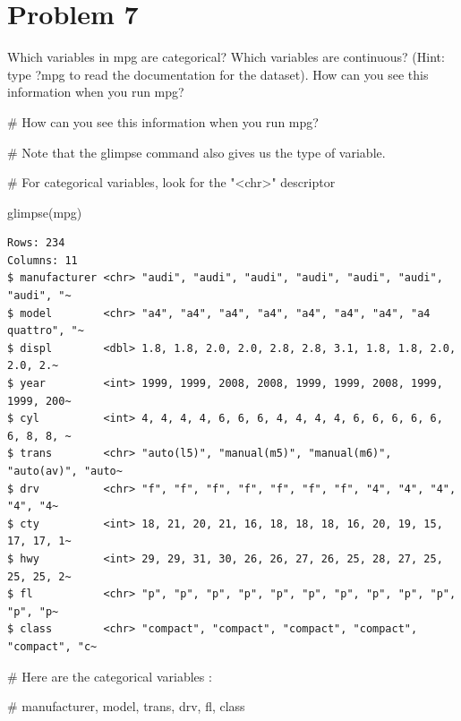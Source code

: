 \documentclass[
  letterpaper,
  DIV=11,
  numbers=noendperiod]{scrreprt}
\newenvironment{Shaded}{\begin{snugshade}}{\end{snugshade}}
\newcommand{\CommentTok}[1]{\textcolor[rgb]{0.37,0.37,0.37}{#1}}
\newcommand{\FunctionTok}[1]{\textcolor[rgb]{0.28,0.35,0.67}{#1}}
\newcommand{\NormalTok}[1]{\textcolor[rgb]{0.00,0.23,0.31}{#1}}
\begin{document}
\section*{Problem 7}\label{problem-7-3}


Which variables in mpg are categorical? Which variables are continuous?
(Hint: type ?mpg to read the documentation for the dataset). How can you
see this information when you run mpg?

\begin{Shaded}
\begin{Highlighting}[]
\CommentTok{\# How can you see this information when you run mpg?}

\CommentTok{\# Note that the glimpse command also gives us the type of variable.}

\CommentTok{\# For categorical variables, look for the "\textless{}chr\textgreater{}" descriptor}

\FunctionTok{glimpse}\NormalTok{(mpg)}
\end{Highlighting}
\end{Shaded}

\begin{verbatim}
Rows: 234
Columns: 11
$ manufacturer <chr> "audi", "audi", "audi", "audi", "audi", "audi", "audi", "~
$ model        <chr> "a4", "a4", "a4", "a4", "a4", "a4", "a4", "a4 quattro", "~
$ displ        <dbl> 1.8, 1.8, 2.0, 2.0, 2.8, 2.8, 3.1, 1.8, 1.8, 2.0, 2.0, 2.~
$ year         <int> 1999, 1999, 2008, 2008, 1999, 1999, 2008, 1999, 1999, 200~
$ cyl          <int> 4, 4, 4, 4, 6, 6, 6, 4, 4, 4, 4, 6, 6, 6, 6, 6, 6, 8, 8, ~
$ trans        <chr> "auto(l5)", "manual(m5)", "manual(m6)", "auto(av)", "auto~
$ drv          <chr> "f", "f", "f", "f", "f", "f", "f", "4", "4", "4", "4", "4~
$ cty          <int> 18, 21, 20, 21, 16, 18, 18, 18, 16, 20, 19, 15, 17, 17, 1~
$ hwy          <int> 29, 29, 31, 30, 26, 26, 27, 26, 25, 28, 27, 25, 25, 25, 2~
$ fl           <chr> "p", "p", "p", "p", "p", "p", "p", "p", "p", "p", "p", "p~
$ class        <chr> "compact", "compact", "compact", "compact", "compact", "c~
\end{verbatim}

\begin{Shaded}
\begin{Highlighting}[]
\CommentTok{\# Here are the categorical variables :}

\CommentTok{\# manufacturer, model, trans, drv, fl, class}
\end{Highlighting}
\end{Shaded}
\end{document}
